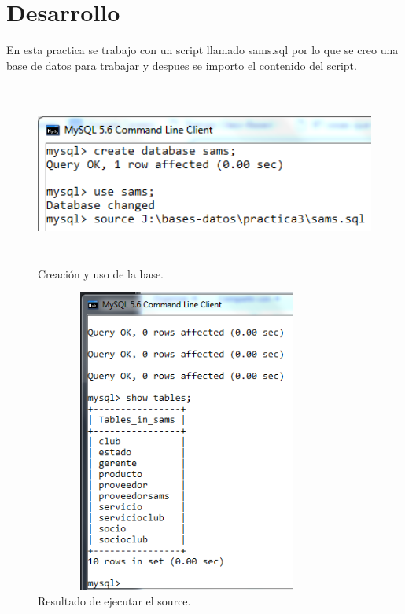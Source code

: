 \documentclass[12pt, titlepage]{article}
\begin{document}
    \section{Desarrollo}
        En esta practica se trabajo con un script llamado sams.sql por lo que se creo una base de datos para trabajar y despues se importo el contenido del script.
        \begin{figure}[H]
            \begin{center}
                \includegraphics[width=14cm, height=6cm]{img/source.png}
                \caption{Creación y uso de la base.}
                \label{fig:hasta-use}
            \end{center}
        \end{figure}
        \begin{figure}[H]
            \begin{center}
                \includegraphics[width=10cm, height=10cm]{img/post-source.png}
                \caption{Resultado de ejecutar el source.}
                \label{fig:tablas}
            \end{center}
        \end{figure}
\end{document}
